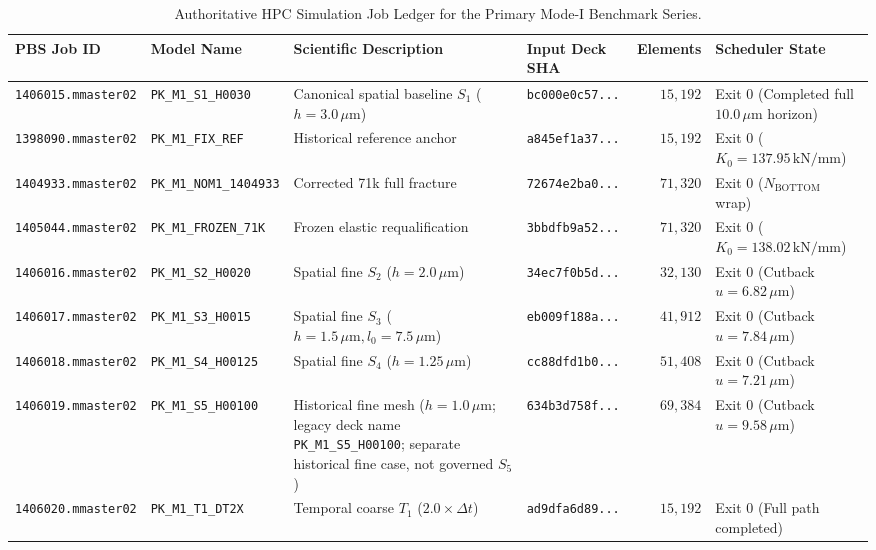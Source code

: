 \begin{table}[htbp]
\centering
\fontsize{6.0}{7.2}\selectfont
\setlength{\tabcolsep}{2.0pt}
\renewcommand{\arraystretch}{0.78}
\caption{Authoritative HPC Simulation Job Ledger for the Primary Mode-I Benchmark Series.}
\label{tab:app_mode1_job_ledger}
\begin{tabularx}{\textwidth}{llXlrl}
\toprule
\textbf{PBS Job ID} & \textbf{Model Name} & \textbf{Scientific Description} & \textbf{Input Deck SHA} & \textbf{Elements} & \textbf{Scheduler State} \\
\midrule
\texttt{1406015.mmaster02} & \texttt{PK\_M1\_S1\_H0030} & Canonical spatial baseline $S_1$ ($h=3.0\,\mu\text{m}$) & \texttt{bc000e0c57...} & $15{,}192$ & Exit 0 (Completed full $10.0\,\mu\text{m}$ horizon) \\
\texttt{1398090.mmaster02} & \texttt{PK\_M1\_FIX\_REF} & Historical reference anchor & \texttt{a845ef1a37...} & $15{,}192$ & Exit 0 ($K_0 = 137.95\,\text{kN/mm}$) \\
\texttt{1404933.mmaster02} & \texttt{PK\_M1\_NOM1\_1404933} & Corrected 71k full fracture & \texttt{72674e2ba0...} & $71{,}320$ & Exit 0 ($N_{\mathrm{BOTTOM}}$ wrap) \\
\texttt{1405044.mmaster02} & \texttt{PK\_M1\_FROZEN\_71K} & Frozen elastic requalification & \texttt{3bbdfb9a52...} & $71{,}320$ & Exit 0 ($K_0 = 138.02\,\text{kN/mm}$) \\
\texttt{1406016.mmaster02} & \texttt{PK\_M1\_S2\_H0020} & Spatial fine $S_2$ ($h=2.0\,\mu\text{m}$) & \texttt{34ec7f0b5d...} & $32{,}130$ & Exit 0 (Cutback $u=6.82\,\mu\text{m}$) \\
\texttt{1406017.mmaster02} & \texttt{PK\_M1\_S3\_H0015} & Spatial fine $S_3$ ($h=1.5\,\mu\text{m}, l_0=7.5\,\mu\text{m}$) & \texttt{eb009f188a...} & $41{,}912$ & Exit 0 (Cutback $u=7.84\,\mu\text{m}$) \\
\texttt{1406018.mmaster02} & \texttt{PK\_M1\_S4\_H00125} & Spatial fine $S_4$ ($h=1.25\,\mu\text{m}$) & \texttt{cc88dfd1b0...} & $51{,}408$ & Exit 0 (Cutback $u=7.21\,\mu\text{m}$) \\
\texttt{1406019.mmaster02} & \texttt{PK\_M1\_S5\_H00100} & Historical fine mesh ($h=1.0\,\mu\text{m}$; legacy deck name \texttt{PK\_M1\_S5\_H00100}; separate historical fine case, not governed $S_5$) & \texttt{634b3d758f...} & $69{,}384$ & Exit 0 (Cutback $u=9.58\,\mu\text{m}$) \\
\texttt{1406020.mmaster02} & \texttt{PK\_M1\_T1\_DT2X} & Temporal coarse $T_1$ ($2.0\times\Delta t$) & \texttt{ad9dfa6d89...} & $15{,}192$ & Exit 0 (Full path completed) \\

\end{tabularx}
\end{table}

